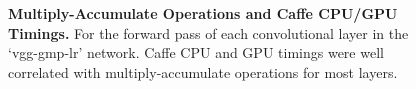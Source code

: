 \begin{figure}[tb]
{\begin{tikzpicture}
\end{tikzpicture}
}
\caption{\textbf{Multiply-Accumulate Operations and Caffe CPU/GPU Timings.} For the forward pass of each convolutional layer in the `vgg-gmp-lr' network. Caffe CPU and GPU timings were well correlated with multiply-accumulate operations for most layers.}
\label{fig:mavstimings}
\end{figure}
